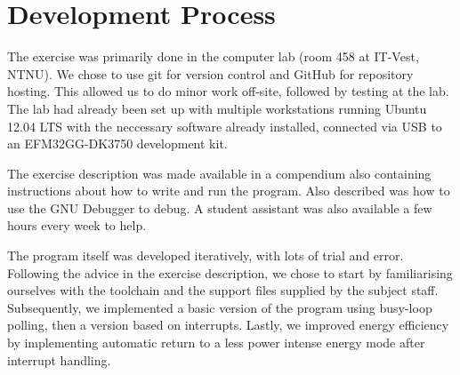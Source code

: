 \section{Development Process}

The exercise was primarily done in the computer lab (room 458 at IT-Vest, NTNU). We chose to use git for version control and GitHub for repository hosting. This allowed us to do minor work off-site, followed by testing at the lab.
The lab had already been set up with multiple workstations running Ubuntu 12.04 LTS with the neccessary software already installed, connected via USB to an EFM32GG-DK3750 development kit.

The exercise description was made available in a compendium also containing instructions about how to write and run the program. Also described was how to use the GNU Debugger to debug. A student assistant was also available a few hours every week to help.

The program itself was developed iteratively, with lots of trial and error. Following the advice in the exercise description, we chose to start by familiarising ourselves with the toolchain and the support files supplied by the subject staff. Subsequently, we implemented a basic version of the program using busy-loop polling, then a version based on interrupts. Lastly, we improved energy efficiency by implementing automatic return to a less power intense energy mode after interrupt handling.
